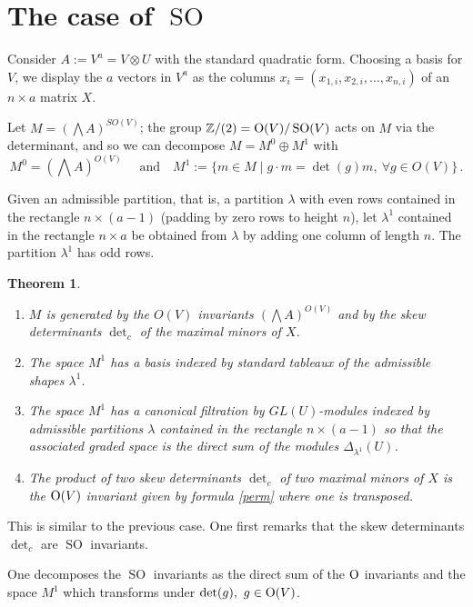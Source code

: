 \documentclass[10pt]{amsart}
\newtheorem{theorem}{Theorem}[section]
\theoremstyle{definition}
\theoremstyle{remark}
\newcommand{\Z}{\mathbb Z}
\newcommand{\SO}{\operatorname{SO}}
\begin{document}
\section{The case of $\SO$}


 Consider $A:=V^a =V\otimes U$ with the standard quadratic form.   Choosing a basis for $V$, we  display the $a$ vectors in $V^a$  as the columns $x_i=(x_{1,i}, x_{2,i},\dots, x_{n,i})$ of an $n\times a$ matrix $X$.\medskip
 
 
 
 
 Let $M=(\bigwedge A)^{SO(V)}$; the group  $\Z/(2)={\rm O}(V)/\SO(V)$ acts on $M$ via the determinant, and so we can decompose 
  $M=M^0\oplus M^1$ with  $$ M^0=(\bigwedge A)^{ O(V)} \quad\text{ and}\quad M^1:=\{m\in M\mid g\cdot m=\det(g)m,\ \forall g\in O(V)\}\,. $$
 
 Given an admissible partition, that is, a partition $\lambda$ with even rows contained in the rectangle   $n\times(a-1)$ (padding by zero rows to height $n$), let $\lambda^1$ contained in the rectangle $n\times a$ be obtained from $\lambda$ by adding  one   column  of length $n$. The partition $\lambda^1$ has odd rows.
 \begin{theorem}\label{fonn1}\strut 
 \begin{enumerate}\item $M$ is generated by the $O(V)$ invariants $(\bigwedge A)^{O(V)}$ and by the skew determinants $ {\det}_c$ of the maximal minors of $X$.
\item The space   $M^1$ has a basis indexed by standard tableaux of the admissible shapes $\lambda^1$.

\item The space   $M^1$ has a canonical  filtration by $GL(U)$-modules indexed by admissible partitions $\lambda$ contained in the rectangle $n\times(a-1)$ so that the associated graded space is the direct sum of the modules $\Delta_{\lambda^1}(U) $. 
\item  The product of two skew determinants $ {\det}_c$  of two   maximal minors of $X$   is the ${\rm O}(V)$  invariant given by formula  \eqref{perm} where one is transposed.
 \end{enumerate}

\end{theorem}




This  is similar to the previous case. One first remarks that the  skew determinants $ {\det}_c$ are $\SO$ invariants.

One decomposes  the  $\SO$ invariants  as the direct sum of the $\rm O$ invariants and the space  $M^1$  which transforms under $\det(g),\ g\in {\rm O}(V)$.\smallskip
\end{document}
